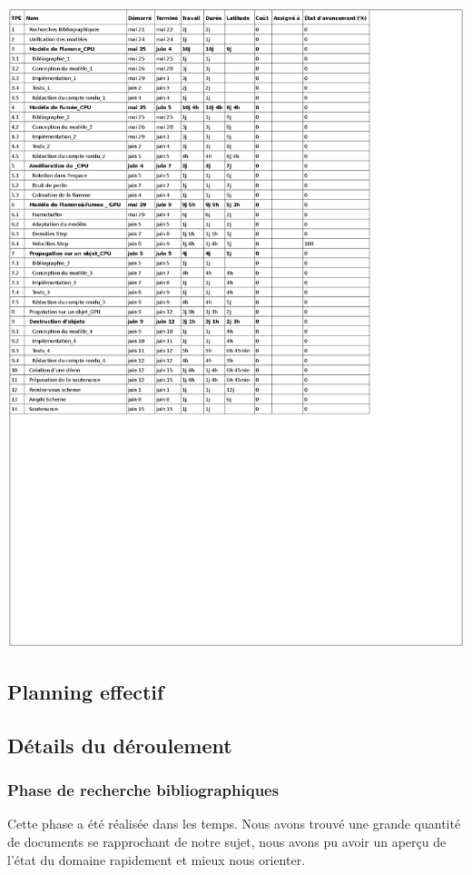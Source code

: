\documentclass[a4paper,10pt]{article}
\begin{document}
        \includegraphics[scale=0.8]{../Planning/Planning2.ps}




\subsection{Planning effectif}




        
\subsection{Détails du déroulement}
\subsubsection{Phase de recherche bibliographiques}
Cette phase a été réalisée dans les temps. Nous avons trouvé une grande quantité de documents
se rapprochant de notre sujet, nous avons pu avoir un aperçu de l'état du domaine rapidement et mieux nous orienter.
\end{document}
